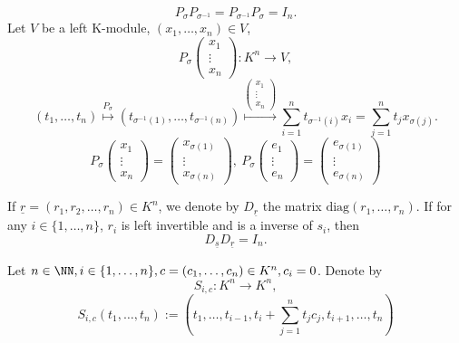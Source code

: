 \begin{box2}
    $$P_\sigma P_{\sigma^{-1}}=P_{\sigma^{-1}}P_\sigma=I_{n}.$$
    Let $V$ be a left K-module, $(x_1,\dots,x_n)\in V$,
    $$P_\sigma\begin{pmatrix}
 x_1\\
 \vdots\\
x_n
\end{pmatrix}
:K^n\longrightarrow V,$$
$$(t_1,\dots,t_n)\overset{P_\sigma}{\longmapsto}(t_{\sigma^{-1}(1)},\dots,t_{\sigma^{-1}(n)})\overset{\begin{pmatrix}
 x_1\\
 \vdots\\
x_n
\end{pmatrix}}{\longmapsto}\sum_{i=1}^{n}t_{\sigma^{-1}(i)}x_i=\sum_{j=1}^{n}t_jx_{\sigma(j)}.$$
$$P_\sigma\begin{pmatrix}
    x_1\\
    \vdots\\
    x_n
\end{pmatrix}=\begin{pmatrix}
    x_{\sigma(1)}\\
    \vdots\\
    x_{\sigma(n)}
\end{pmatrix},\ P_\sigma\begin{pmatrix}
    e_1\\
    \vdots\\
    e_n
\end{pmatrix}=\begin{pmatrix}
    e_{\sigma(1)}\\
    \vdots\\
    e_{\sigma(n)}
\end{pmatrix}$$
\end{box2}
\begin{definitionenv}
    If $\underline{r}=(r_1,r_2,\dots,r_n)\in K^n$, we denote by $D_{\underline{r}}$ the matrix $\mathrm{diag}(r_1,\dots,r_n)$.
    If for any $i\in \{1,\dots,n\}$, $r_i$ is left invertible and is a inverse of $s_i$, then 
    $$D_{\underline{s}}D_{\underline{r}}=I_n.$$
\end{definitionenv}
\begin{definitionenv}
    Let $n\in \NN, i\in \{1,\dots,n\},c=\left(c_1,\dots,c_n\right)\in K^n,c_i=0$. Denote by 
    $$S_{i,c}:K^n\longrightarrow K^n,$$
    $$S_{i,c}(t_1,\dots,t_n):=\left(t_1,\dots,t_{i-1},t_i+\sum_{j=1}^{n}t_jc_j,t_{i+1},\dots,t_n\right)$$
\end{definitionenv}
